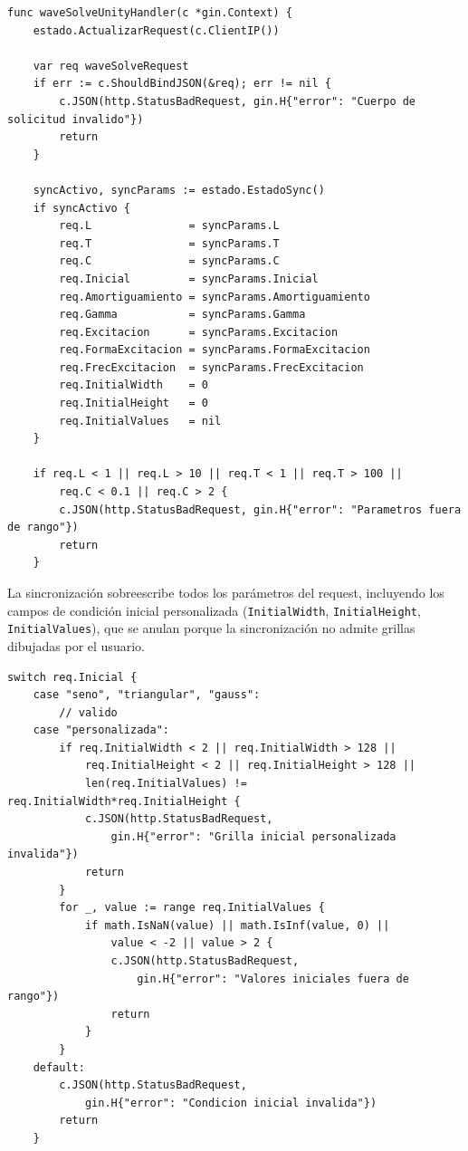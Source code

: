 \documentclass[12pt, a4paper]{article}
\begin{document}
\begin{lstlisting}[style=golang, caption={\texttt{wave\_api.go} — handler principal}]
func waveSolveUnityHandler(c *gin.Context) {
    estado.ActualizarRequest(c.ClientIP())

    var req waveSolveRequest
    if err := c.ShouldBindJSON(&req); err != nil {
        c.JSON(http.StatusBadRequest, gin.H{"error": "Cuerpo de solicitud invalido"})
        return
    }

    syncActivo, syncParams := estado.EstadoSync()
    if syncActivo {
        req.L               = syncParams.L
        req.T               = syncParams.T
        req.C               = syncParams.C
        req.Inicial         = syncParams.Inicial
        req.Amortiguamiento = syncParams.Amortiguamiento
        req.Gamma           = syncParams.Gamma
        req.Excitacion      = syncParams.Excitacion
        req.FormaExcitacion = syncParams.FormaExcitacion
        req.FrecExcitacion  = syncParams.FrecExcitacion
        req.InitialWidth    = 0
        req.InitialHeight   = 0
        req.InitialValues   = nil
    }

    if req.L < 1 || req.L > 10 || req.T < 1 || req.T > 100 ||
        req.C < 0.1 || req.C > 2 {
        c.JSON(http.StatusBadRequest, gin.H{"error": "Parametros fuera de rango"})
        return
    }
\end{lstlisting}

La sincronización sobreescribe todos los parámetros del request, incluyendo los campos
de condición inicial personalizada (\texttt{InitialWidth}, \texttt{InitialHeight},
\texttt{InitialValues}), que se anulan porque la sincronización no admite grillas
dibujadas por el usuario.

\begin{lstlisting}[style=golang, caption={Validación de la condición inicial de la onda}]
    switch req.Inicial {
    case "seno", "triangular", "gauss":
        // valido
    case "personalizada":
        if req.InitialWidth < 2 || req.InitialWidth > 128 ||
            req.InitialHeight < 2 || req.InitialHeight > 128 ||
            len(req.InitialValues) != req.InitialWidth*req.InitialHeight {
            c.JSON(http.StatusBadRequest,
                gin.H{"error": "Grilla inicial personalizada invalida"})
            return
        }
        for _, value := range req.InitialValues {
            if math.IsNaN(value) || math.IsInf(value, 0) ||
                value < -2 || value > 2 {
                c.JSON(http.StatusBadRequest,
                    gin.H{"error": "Valores iniciales fuera de rango"})
                return
            }
        }
    default:
        c.JSON(http.StatusBadRequest,
            gin.H{"error": "Condicion inicial invalida"})
        return
    }
\end{lstlisting}
\end{document}
